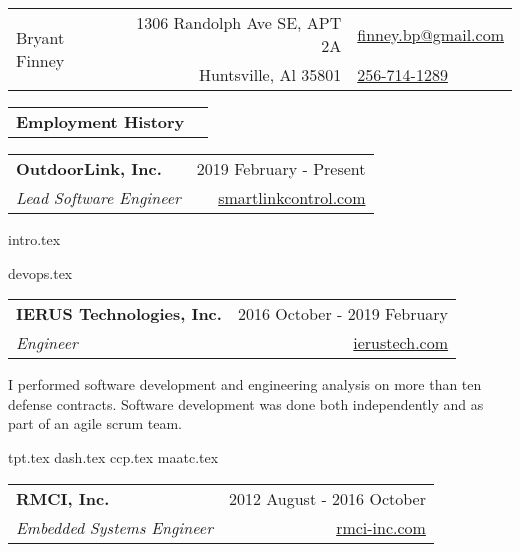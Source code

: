 \documentclass[10pt,a4paper]{article}
\newcommand{\csection}[1]{\Large\textbf{#1}}
\newcommand{\csubsection}[1]{\large\textbf{#1}}
\begin{document}
\begin{table}
  \noindent\begin{tabularx}{\textwidth}{Xr|l}
    \toprule
    \multirow{2}{*}{\Huge Bryant Finney} & 1306 Randolph Ave SE, APT 2A & \href{mailto:finneybp@gmail.com}{finney.bp@gmail.com} \\
                                         & Huntsville, Al 35801         & \href{tel:1-256-714-1289}{256-714-1289}               \\
    \bottomrule
  \end{tabularx}
\end{table}

\noindent\begin{tabularx}{\textwidth}{Xr}
  \csection{Employment History} & \\
\end{tabularx}
\smallskip

\noindent\begin{tabularx}{\textwidth}{Xr}
  \toprule
  \csubsection{OutdoorLink, Inc.} & 2019 February - Present                                   \\
  \textit{Lead Software Engineer} & \href{http://smartlinkcontrol.com/}{smartlinkcontrol.com} \\
\end{tabularx}
\smallskip

{intro.tex}

\bigskip

{devops.tex}

\noindent\begin{tabularx}{\textwidth}{Xr}
  \toprule
  \csubsection{IERUS Technologies, Inc.} & 2016 October - 2019 February                     \\
  \textit{Engineer}                      & \href{https://www.ierustech.com/}{ierustech.com} \\
\end{tabularx}
\smallskip

I performed software development and engineering analysis on more than ten defense
contracts. Software development was done both independently and as part of an agile
scrum team.

\bigskip

{tpt.tex}
{dash.tex}
{ccp.tex}
{maatc.tex}

\noindent\begin{tabularx}{\textwidth}{Xr}
  \toprule
  \csubsection{RMCI, Inc.}           & 2012 August - 2016 October                     \\
  \textit{Embedded Systems Engineer} & \href{https://www.rmci-inc.com/}{rmci-inc.com} \\
\end{tabularx}
\smallskip
\end{document}
